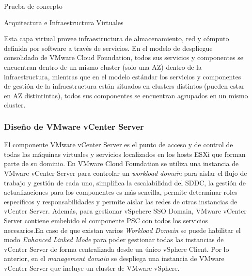 \begin{section}{Prueba de concepto}

\begin{subsection}{Arquitectura e Infraestructura Virtuales\cite{CFVirtInfraes}}

Esta capa virtual provee infraestructura de almacenamiento, red y cómputo definida por software a través de servicios. En el modelo de despliegue consolidado de VMware Cloud Foundation, todos sus servicios y componentes se encuentran dentro de un mismo cluster (solo una AZ) dentro de la infraestructura, mientras que en el modelo estándar los servicios y componentes de gestión de la infraestructura están situados en clusters distintos (pueden estar en AZ distintintas), todos sus componentes se encuentran agrupados en un mismo cluster.



\subsubsection{Diseño de VMware vCenter Server}
El componente VMware vCenter Server es el punto de acceso y de control de todas las máquinas virtuales y servicios localizados en los hosts ESXi que forman parte de su dominio. En VMware Cloud Foundation se utiliza una instancia de VMware vCenter Server para controlar un \textit{workload domain} para aislar el flujo de trabajo y gestión de cada uno, simplifica la escalabilidad del SDDC, la gestión de actualizaciones para los componentes es más sencilla, permite determinar roles específicos y responsabilidades y permite aislar las redes de otras instancias de vCenter Server. Además, para gestionar vSpehere SSO Domain, VMware vCenter Server contiene embebido el componente PSC con todos los servicios necesarios.En caso de que existan varios \textit{Workload Domain} se puede habilitar el modo \textit{Enhanced Linked Mode} para poder gestionar todas las instancias de vCenter Server de forma centralizada desde un único vSphere Client.
Por lo anterior, en el \textit{management domain} se despliega una instancia de VMware vCenter Server que incluye un cluster de VMware vSphere.




\end{subsection}
\end{section}
